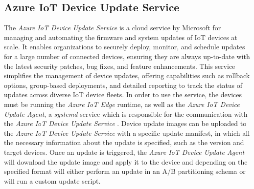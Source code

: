 \subsection{Azure IoT Device Update Service}
\label{sec:azure-iot-device-update-service}
The \textit{Azure IoT Device Update Service} is a cloud service by Microsoft
for managing and automating the firmware and system updates of \ac{IoT} devices at scale.
It enables organizations to securely deploy, monitor, and schedule updates for
a large number of connected devices, ensuring they are always up-to-date with
the latest security patches, bug fixes, and feature enhancements. This service
simplifies the management of device updates, offering capabilities such as
rollback options, group-based deployments, and detailed reporting to track the
status of updates across diverse \ac{IoT} device fleets. In order to use the service,
the devices must be running the \textit{Azure IoT Edge} runtime, as well as the
\textit{Azure IoT Device Update Agent}, a \textit{systemd} service which is
responsible for the communication with the \textit{Azure IoT Device Update Service}
\cite{msdoc-adu}. Device update images can be uploaded to the
\textit{Azure IoT Device Update Service} with a specific update manifest, in
which all the necessary information about the update is specified, such as the
version and target devices. Once an update is triggered, the \textit{Azure IoT Device Update
Agent} will download the update image and apply it to the device and depending
on the specified format will either perform an update in an A/B partitioning
schema or will run a custom update script.


